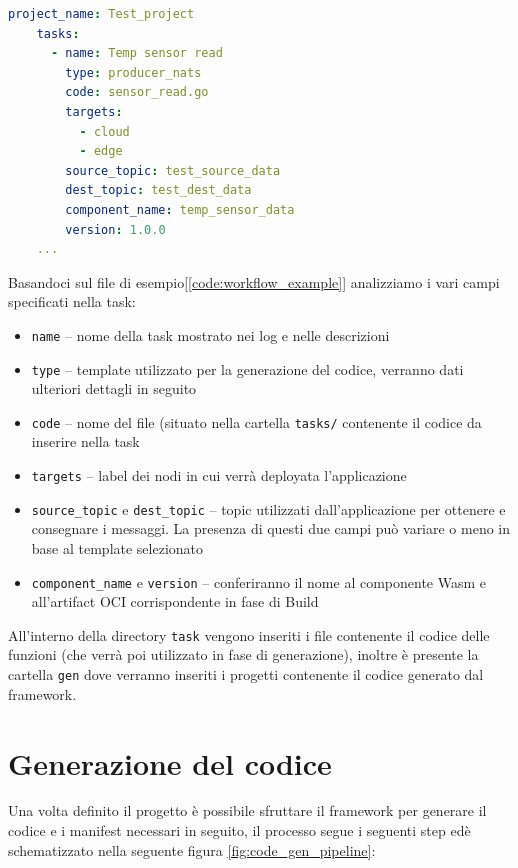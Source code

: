 \begin{lstlisting}[language=yaml, caption={Esempio workflow.yaml}, captionpos=b, label={code:workflow_example}]
    project_name: Test_project
    tasks:
      - name: Temp sensor read
        type: producer_nats
        code: sensor_read.go
        targets:
          - cloud
          - edge
        source_topic: test_source_data
        dest_topic: test_dest_data
        component_name: temp_sensor_data
        version: 1.0.0
    ...
\end{lstlisting}

Basandoci sul file di esempio[\ref{code:workflow_example}] analizziamo i vari campi specificati nella task:
\begin{itemize}
    \item \texttt{name} -- nome della task mostrato nei log e nelle descrizioni
    \item \texttt{type} -- template utilizzato per la generazione del codice, verranno dati ulteriori dettagli in seguito
    \item \texttt{code} -- nome del file (situato nella cartella \texttt{tasks/} contenente il codice da inserire nella task
    \item \texttt{targets} -- label dei nodi in cui verrà deployata l'applicazione
    \item \texttt{source\_topic} e \texttt{dest\_topic} -- topic utilizzati dall'applicazione per ottenere e consegnare i messaggi. La presenza di questi due campi può variare o meno in base al template selezionato
    \item \texttt{component\_name} e \texttt{version} -- conferiranno il nome al componente Wasm e all'artifact OCI corrispondente in fase di Build
\end{itemize}

All'interno della directory \texttt{task} vengono inseriti i file contenente il codice delle funzioni (che verrà poi utilizzato in fase di generazione), inoltre è presente la cartella \texttt{gen} dove verranno inseriti i progetti contenente il codice generato dal framework.

\section{Generazione del codice}

Una volta definito il progetto è possibile sfruttare il framework per generare il codice e i manifest necessari in seguito, il processo segue i seguenti step edè  schematizzato nella seguente figura \ref{fig:code_gen_pipeline}:

